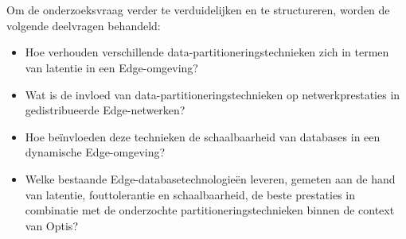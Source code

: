 \section{}%
\label{sec:deelvragen}

Om de onderzoeksvraag verder te verduidelijken en te structureren, worden de volgende deelvragen behandeld:
\begin{itemize}
    \item Hoe verhouden verschillende data-partitioneringstechnieken zich in termen van latentie in een Edge-omgeving?
    \item Wat is de invloed van data-partitioneringstechnieken op netwerkprestaties in gedistribueerde Edge-netwerken?
    \item Hoe beïnvloeden deze technieken de schaalbaarheid van databases in een dynamische Edge-omgeving?
    \item Welke bestaande Edge-databasetechnologieën leveren, gemeten aan de hand van latentie, fouttolerantie en schaalbaarheid, de beste prestaties in combinatie met de onderzochte partitioneringstechnieken binnen de context van Optis?
\end{itemize}
